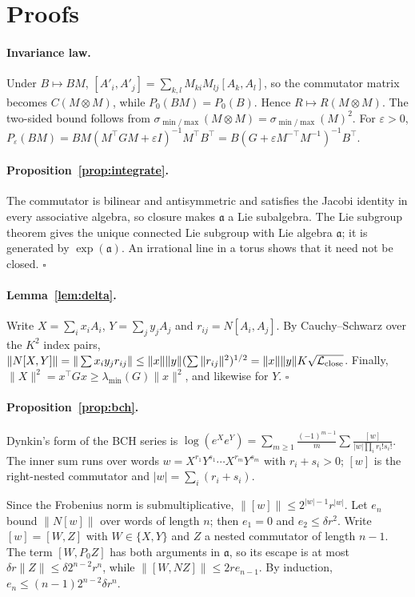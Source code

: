 \section{Proofs}\label{app:proofs}
\paragraph{Invariance law.}
Under $B\mapsto BM$, $[A'_i,A'_j]=\sum_{k,l}M_{ki}M_{lj}[A_k,A_l]$, so the commutator matrix becomes
$C(M\otimes M)$, while $P_0(BM)=P_0(B)$. Hence $R\mapsto R(M\otimes M)$. The two-sided bound follows from
$\sigma_{\min/\max}(M\otimes M)=\sigma_{\min/\max}(M)^2$. For $\varepsilon>0$,
$P_\varepsilon(BM)=BM(M^\top GM+\varepsilon I)^{-1}M^\top B^\top=B(G+\varepsilon M^{-\top}M^{-1})^{-1}B^\top$.

\paragraph{Proposition~\ref{prop:integrate}.}
The commutator is bilinear and antisymmetric and satisfies the Jacobi identity in every associative algebra,
so closure makes $\mathfrak a$ a Lie subalgebra. The Lie subgroup theorem
\citep[Thm.~5.20]{hall2015lie} gives the unique connected Lie subgroup with Lie algebra $\mathfrak a$; it is
generated by $\exp(\mathfrak a)$. An irrational line in a torus shows that it need not be closed.
$\square$

\paragraph{Lemma~\ref{lem:delta}.}
Write $X=\sum_ix_iA_i$, $Y=\sum_jy_jA_j$ and $r_{ij}=N[A_i,A_j]$. By Cauchy--Schwarz over the $K^2$ index
pairs, $\|N[X,Y]\|=\|\sum x_iy_jr_{ij}\|\le\|x\|\|y\|(\sum\|r_{ij}\|^2)^{1/2}=\|x\|\|y\|K\sqrt{\mathcal{L}_{\mathrm{close}}}$. Finally,
$\|X\|^2=x^\top Gx\ge\lambda_{\min}(G)\|x\|^2$, and likewise for $Y$. $\square$

\paragraph{Proposition~\ref{prop:bch}.}
Dynkin's form of the BCH series \citep{bonfiglioli2012topics} is
$\log(e^Xe^Y)=\sum_{m\ge1}\frac{(-1)^{m-1}}{m}\sum\frac{[w]}{|w|\prod_i r_i!s_i!}$. The inner sum runs over
words $w=X^{r_1}Y^{s_1}\cdots X^{r_m}Y^{s_m}$ with $r_i+s_i>0$; $[w]$ is the right-nested commutator and
$|w|=\sum_i(r_i+s_i)$.

Since the Frobenius norm is submultiplicative, $\|[w]\|\le2^{|w|-1}r^{|w|}$. Let $e_n$ bound $\|N[w]\|$ over
words of length $n$; then $e_1=0$ and $e_2\le\delta r^2$. Write $[w]=[W,Z]$ with $W\in\{X,Y\}$ and $Z$ a
nested commutator of length $n-1$. The term $[W,P_0Z]$ has both arguments in $\mathfrak a$, so its escape is
at most $\delta r\|Z\|\le\delta2^{n-2}r^n$, while $\|[W,NZ]\|\le2re_{n-1}$. By induction,
$e_n\le(n-1)2^{n-2}\delta r^n$.

